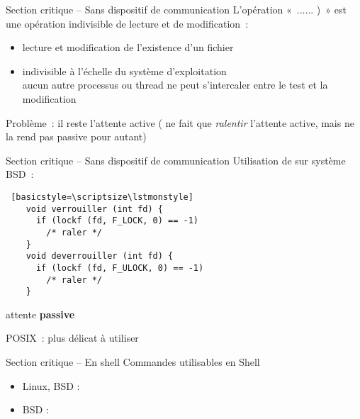 \begin {frame} {Section critique -- Sans dispositif de communication}
    L'opération «~......\code
    {)}~» est une opération indivisible de lecture et de modification~:

    \begin {itemize}
	\item lecture et modification de l'existence d'un fichier
	\item indivisible à l'échelle du système d'exploitation \\
	    \implique aucun autre processus ou thread ne peut s'intercaler
	    entre le test et la modification

    \end {itemize}

    Problème~: il reste l'attente active
    ( ne fait que \emph {ralentir} l'attente active, mais ne
    la rend pas passive pour autant)

\end {frame}

\begin {frame} [fragile] {Section critique -- Sans dispositif de communication}
    Utilisation de  sur système BSD~:

    \begin {lstlisting} [basicstyle=\scriptsize\lstmonstyle]
    void verrouiller (int fd) {
      if (lockf (fd, F_LOCK, 0) == -1)
        /* raler */
    }
    void deverrouiller (int fd) {
      if (lockf (fd, F_ULOCK, 0) == -1)
        /* raler */
    }
    \end{lstlisting}

    \implique attente \textbf {passive}

    \vspace* {3mm}

    POSIX~:  plus délicat à utiliser
\end{frame}


\begin {frame} {Section critique -- En shell}
    Commandes utilisables en Shell
    \begin {itemize}
	\item Linux, BSD :


	\item BSD :

    \end {itemize}

\end {frame}


